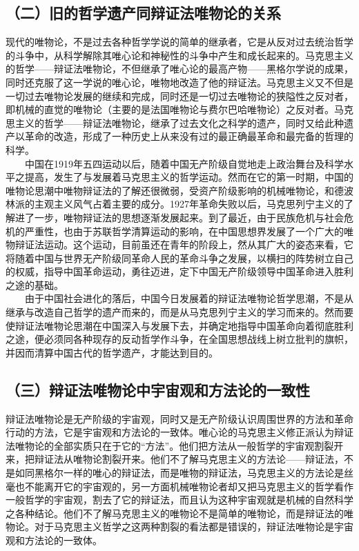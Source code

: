 \documentclass[cn,11pt,chinese]{elegantbook}
\def\myformat#1{\hfil\hfil #1}
\begin{document}
\subsection*{\myformat{（二）旧的哲学遗产同辩证法唯物论的关系}}
现代的唯物论，不是过去各种哲学学说的简单的继承者，它是从反对过去统治哲学的斗争中，从科学解除其唯心论和神秘性的斗争中产生和成长起来的。马克思主义的哲学——辩证法唯物论，不但继承了唯心论的最高产物——黑格尔学说的成果，同时还克服了这一学说的唯心论，唯物地改造了他的辩证法。马克思主义又不但是一切过去唯物论发展的继续和完成，同时还是一切过去唯物论的狭隘性之反对者，即机械的直觉的唯物论（主要的是法国唯物论与费尔巴哈唯物论）之反对者。马克思主义的哲学——辩证法唯物论，继承了过去文化之科学的遗产，同时又给此种遗产以革命的改造，形成了一种历史上从来没有过的最正确最革命和最完备的哲理的科学。\\
　　中国在1919年五四运动以后，随着中国无产阶级自觉地走上政治舞台及科学水平之提高，发生了与发展着马克思主义的哲学运动。然而在它的第一时期，中国的唯物论思潮中唯物辩证法的了解还很微弱，受资产阶级影响的机械唯物论，和德波林派的主观主义风气占着主要的成分。1927年革命失败以后，马克思列宁主义的了解进了一步，唯物辩证法的思想逐渐发展起来。到了最近，由于民族危机与社会危机的严重性，也由于苏联哲学清算运动的影响，在中国思想界发展了一个广大的唯物辩证法运动。这个运动，目前虽还在青年的阶段上，然从其广大的姿态来看，它将随着中国与世界无产阶级同革命人民的革命斗争之发展，以横扫的阵势树立自己的权威，指导中国革命运动，勇往迈进，定下中国无产阶级领导中国革命进入胜利之途的基础。\\
　　由于中国社会进化的落后，中国今日发展着的辩证法唯物论哲学思潮，不是从继承与改造自己哲学的遗产而来的，而是从马克思列宁主义的学习而来的。然而要使辩证法唯物论思潮在中国深入与发展下去，并确定地指导中国革命向着彻底胜利之途，便必须同各种现存的反动哲学作斗争，在全国思想战线上树立批判的旗帜，并因而清算中国古代的哲学遗产，才能达到目的。\\
\subsection*{\myformat{（三）辩证法唯物论中宇宙观和方法论的一致性}}
辩证法唯物论是无产阶级的宇宙观，同时又是无产阶级认识周围世界的方法和革命行动的方法，它是宇宙观和方法论的一致体。唯心论的马克思主义修正派认为辩证法唯物论的全部实质只在于它的“方法”。他们把方法从一般哲学的宇宙观割裂开来，把辩证法从唯物论割裂开来。他们不了解马克思主义的方法论——辩证法，不是如同黑格尔一样的唯心的辩证法，而是唯物的辩证法，马克思主义的方法论是丝毫也不能离开它的宇宙观的，另一方面机械唯物论者却又把马克思主义的哲学看作一般哲学的宇宙观，割去了它的辩证法，而且认为这种宇宙观就是机械的自然科学之各种结论。他们不了解马克思主义的唯物论不是简单的唯物论，而是辩证法的唯物论。对于马克思主义哲学之这两种割裂的看法都是错误的，辩证法唯物论是宇宙观和方法论的一致体。  \\
\end{document}
